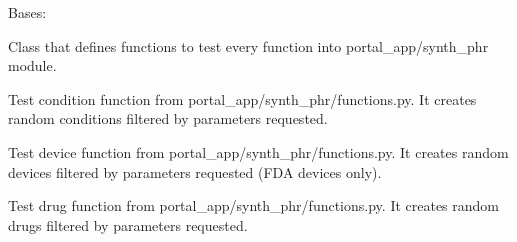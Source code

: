 \documentclass[letterpaper,10pt,english]{sphinxmanual}
\begin{document}
\begin{fulllineitems}
\label{\detokenize{CE_app.tests:CE_app.tests.test_phr.PHRTestCase}}
\sphinxAtStartPar
Bases: {\hyperref[\detokenize{CE_app.tests:CE_app.tests.BasePHRTestClass}]{}}

\sphinxAtStartPar
Class that defines functions to test every function into portal\_app/synth\_phr module.

\begin{fulllineitems}
\label{\detokenize{CE_app.tests:CE_app.tests.test_phr.PHRTestCase.test_condition}}
\sphinxAtStartPar
Test condition function from portal\_app/synth\_phr/functions.py.
It creates random conditions filtered by parameters requested.

\end{fulllineitems}


\begin{fulllineitems}
\label{\detokenize{CE_app.tests:CE_app.tests.test_phr.PHRTestCase.test_device}}
\sphinxAtStartPar
Test device function from portal\_app/synth\_phr/functions.py.
It creates random devices filtered by parameters requested (FDA devices only).

\end{fulllineitems}


\begin{fulllineitems}
\label{\detokenize{CE_app.tests:CE_app.tests.test_phr.PHRTestCase.test_drug}}
\sphinxAtStartPar
Test drug function from portal\_app/synth\_phr/functions.py.
It creates random drugs filtered by parameters requested.


\end{fulllineitems}
\end{fulllineitems}
\end{document}
